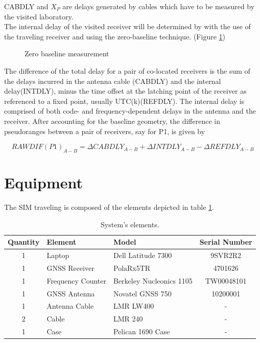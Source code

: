 \documentclass[11pt]{article}
\begin{document}
CABDLY and $X_P$ are delays generated by cables which have to be measured by the visited laboratory.\\
The internal delay of the visited receiver will be determined by with the use of the  traveling receiver and using the zero-baseline technique. (Figure \ref{fig:zerobaseline})


\begin{figure}[ht]
\begin{center}

\caption{Zero baseline measurement}
\label{fig:zerobaseline}
\end{center}
\end{figure}

The difference of the total delay for a pair of co-located receivers is the sum of the delays incurred in the antenna cable (CABDLY) and the internal delay(INTDLY), minus the time offset at the latching
point of the receiver as referenced to a fixed point, usually UTC(k)(REFDLY). The internal delay
is comprised of both code- and frequency-dependent delays in the antenna and the receiver. After
accounting for the baseline geometry, the difference in pseudoranges between a pair of receivers, say
for P1, is given by

\begin{equation}
 RAWDIF(P1)_{A-B} = \Delta CABDLY_{A-B} + \Delta INTDLY_{A-B} - \Delta REFDLY_{A-B}
\end{equation}

\section{Equipment}
The SIM traveling is composed of the elements depicted in table \ref{tab:elements}.



\begin{table}[h]
    \centering
    \begin{tabular}{cllc}
       Quantity & Element & Model & Serial Number\\
       \hline
        1       & Laptop              & Dell Latitude 7300        & 9SVR2R2 \\
        1       & GNSS Receiver       & PolaRx5TR                 & 4701626\\
        1       & Frequency Counter   & Berkeley Nucleonics 1105  & TW00048101\\
        1       & GNSS Antenna        & Novatel GNSS 750          & 10200001 \\
        1       & Antenna Cable       & LMR LW400                 & - \\
        2       & Cable               & LMR 240                   & -\\
        1       & Case& Pelican 1690 Case & -\\
    \end{tabular}
    \caption{System's elements.}
    \label{tab:elements}
\end{table}
\end{document}
